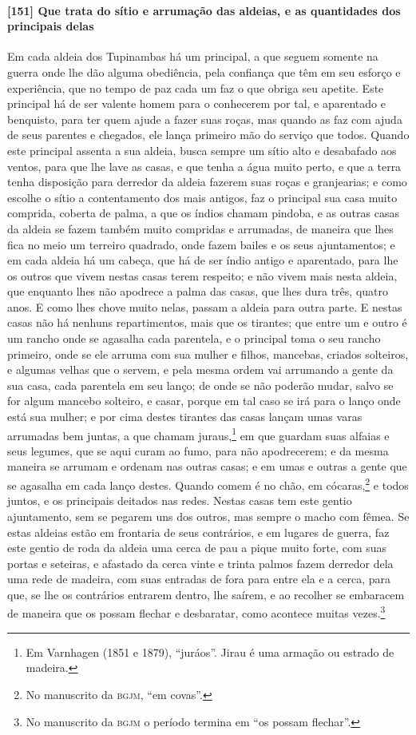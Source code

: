 \paragraph{[151] Que trata do sítio e arrumação das aldeias, e as quantidades dos principais
delas}\quad
Em cada aldeia dos Tupinambas há um principal, a que seguem somente na guerra onde lhe dão
alguma obediência, pela confiança que têm em seu esforço e experiência, que no tempo de
paz cada um faz o que obriga seu apetite. Este principal há de ser valente homem para o
conhecerem por tal, e aparentado e benquisto, para ter quem ajude a fazer suas roças, mas
quando as faz com ajuda de seus parentes e chegados, ele lança primeiro mão do serviço que
todos. Quando este principal assenta a sua aldeia, busca sempre um sítio alto e desabafado
aos ventos, para que lhe lave as casas, e que tenha a água muito perto, e que a terra
tenha disposição para derredor da aldeia fazerem suas roças e granjearias; e como escolhe
o sítio a contentamento dos mais antigos, faz o principal sua casa muito comprida, coberta
de palma, a que os índios chamam pindoba, e as outras casas da aldeia se fazem também
muito compridas e arrumadas, de maneira que lhes fica no meio um terreiro quadrado, onde
fazem bailes e os seus ajuntamentos; e em cada aldeia há um cabeça, que há de ser índio
antigo e aparentado, para lhe os outros que vivem nestas casas terem respeito; e não vivem
mais nesta aldeia, que enquanto lhes não apodrece a palma das casas, que lhes dura três,
quatro anos. E como lhes chove muito nelas, passam a aldeia para outra parte. E nestas
casas não há nenhuns repartimentos, mais que os tirantes; que entre um e outro é um rancho
onde se agasalha cada parentela, e o principal toma o seu rancho primeiro, onde se ele
arruma com sua mulher e filhos, mancebas, criados solteiros, e algumas velhas que o
servem, e pela mesma ordem vai arrumando a gente da sua casa, cada parentela em seu lanço;
de onde se não poderão mudar, salvo se for algum mancebo solteiro, e casar, porque em tal
caso se irá para o lanço onde está sua mulher; e por cima destes tirantes das casas lançam
umas varas arrumadas bem juntas, a que chamam juraus,\footnote{ Em Varnhagen (1851 e 1879),
``juráos''. Jirau é uma armação ou estrado de madeira.} em que guardam suas alfaias e
seus legumes, que se aqui curam ao fumo, para não apodrecerem; e da mesma maneira se
arrumam e ordenam nas outras casas; e em umas e outras a gente que se agasalha em cada
lanço destes. Quando comem é no chão, em cócaras,\footnote{ No manuscrito da
\textsc{bgjm}, ``em covas''.} e todos juntos, e os principais deitados nas redes. Nestas
casas tem este gentio ajuntamento, sem se pegarem uns dos outros, mas sempre o macho com
fêmea. Se estas aldeias estão em frontaria de seus contrários, e em lugares de guerra, faz
este gentio de roda da aldeia uma cerca de pau a pique muito forte, com suas portas e
seteiras, e afastado da cerca vinte e trinta palmos fazem derredor dela uma rede de
madeira, com suas entradas de fora para entre ela e a cerca, para que, se lhe os
contrários entrarem dentro, lhe saírem, e ao recolher se embaracem de maneira que os
possam flechar e desbaratar, como acontece muitas vezes.\footnote{ No manuscrito da
\textsc{bgjm} o período termina em ``os possam flechar''.}

